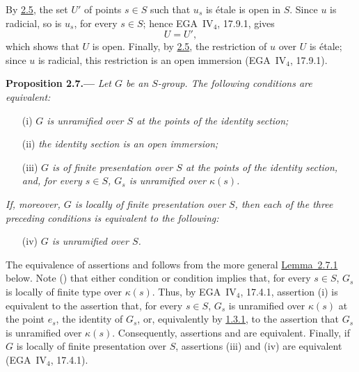 By \hyperref[concl:sga3-VIB-2.5-i]{2.5}\textup{}, the set \(U'\) of points \(s\in S\) such that
\(u_s\) is \'etale is open in \(S\). Since \(u\) is radicial, so
is \(u_s\), for every \(s\in S\); hence EGA~IV\(_4\), 17.9.1,
gives
\[
  U=U',
\]
which shows that \(U\) is open. Finally, by \hyperref[concl:sga3-VIB-2.5-i]{2.5}\textup{}, the
restriction of \(u\) over \(U\) is \'etale; since \(u\) is
radicial, this restriction is an open immersion
(EGA~IV\(_4\), 17.9.1).

\medskip
{}\label{prop:sga3-VIB-2.7}%
\noindent\textbf{Proposition 2.7.---}
\emph{Let \(G\) be an \(S\)-group. The following conditions are
equivalent:}
\begin{enumerate}
\item[\textup{\SGAInlineRefTarget{prop:sga3-VIB-2.7:item:i}(i)}] \emph{\(G\) is unramified over \(S\) at the
  points of the identity section;}
\item[\textup{\SGAInlineRefTarget{prop:sga3-VIB-2.7:item:ii}(ii)}] \emph{the identity section is an open
  immersion;}
\item[\textup{\SGAInlineRefTarget{prop:sga3-VIB-2.7:item:iii}(iii)}] \emph{\(G\) is of finite presentation over
  \(S\) at the points of the identity section, and, for every
  \(s\in S\), \(G_s\) is unramified over \(\kappa(s)\).}
\end{enumerate}
\emph{If, moreover, \(G\) is locally of finite presentation over
\(S\), then each of the three preceding conditions is equivalent
to the following:}
\begin{enumerate}
\item[\textup{(iv)}] \emph{\(G\) is unramified over \(S\).}
\end{enumerate}

The equivalence of assertions \textup{} and \textup{}
follows from the more general \hyperref[lem:sga3-VIB-2.7.1]{Lemma~2.7.1} below. Note ()
that either condition \textup{} or condition \textup{}
implies that, for every \(s\in S\), \(G_s\) is locally of finite
type over \(\kappa(s)\). Thus, by EGA~IV\(_4\), 17.4.1, assertion
\textup{(i)} is equivalent to the assertion that, for every
\(s\in S\), \(G_s\) is unramified over \(\kappa(s)\) at the point
\(e_s\), the identity of \(G_s\), or, equivalently by \hyperref[cor:sga3-VIB-1.3.1]{1.3.1}, to
the assertion that \(G_s\) is unramified over \(\kappa(s)\).
Consequently, assertions \textup{} and \textup{} are
equivalent. Finally, if \(G\) is locally of finite presentation
over \(S\), assertions \textup{(iii)} and \textup{(iv)} are
equivalent (EGA~IV\(_4\), 17.4.1).

